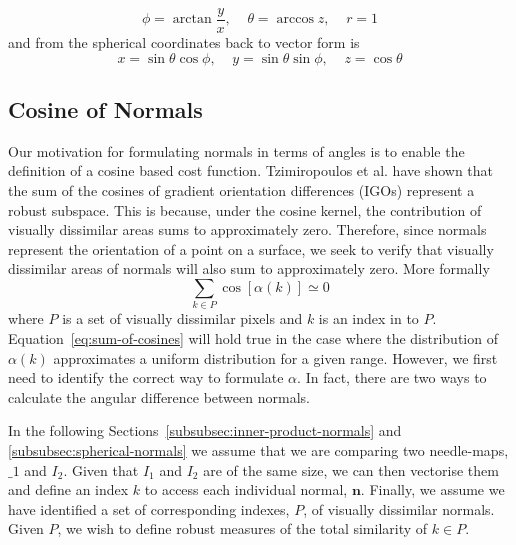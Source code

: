 \begin{equation}\label{eq:normal-to-spherical}
    \phi = \arctan{\frac{y}{x}}, \;\;\;\; \theta = \arccos{z}, \;\;\;\; r = 1
\end{equation}
and from the spherical coordinates back to vector form is
\begin{equation}\label{eq:spherical-to-normal}
    x = \sin{\theta} \cos{\phi}, \;\;\;\; y = \sin{\theta} \sin{\phi}, \;\;\;\; z = \cos{\theta}
\end{equation}
\subsection{Cosine of Normals}\label{subsec:cosine-normals}
Our motivation for formulating normals in terms of angles is to enable the definition of a cosine based cost function. Tzimiropoulos et al. \cite{RefWorks:5} have shown that the sum of the cosines of gradient orientation differences (IGOs) represent a robust subspace. This is because, under the cosine kernel, the contribution of visually dissimilar areas sums to approximately zero. Therefore, since normals represent the orientation of a point on a surface, we seek to verify that visually dissimilar areas of normals will also sum to approximately zero. More formally
\begin{equation}\label{eq:sum-of-cosines}
    \sum_{k \in P} \cos [\alpha (k)] \simeq 0
\end{equation}
where $P$ is a set of visually dissimilar pixels and $k$ is an index in to $P$. Equation~\ref{eq:sum-of-cosines} will hold true in the case where the distribution of $\alpha (k)$ approximates a uniform distribution for a given range. However, we first need to identify the correct way to formulate $\alpha$. In fact, there are two ways to calculate the angular difference between normals.

In the following Sections~\ref{subsubsec:inner-product-normals} and \ref{subsubsec:spherical-normals} we assume that we are comparing two needle-maps, $\_1$ and $I_2$. Given that $I_1$ and $I_2$ are of the same size, we can then vectorise them and define an index $k$ to access each individual normal, $\boldsymbol{n}$. Finally, we assume we have identified a set of corresponding indexes, $P$, of visually dissimilar normals. Given $P$, we wish to define robust measures of the total similarity of $k \in P$.
